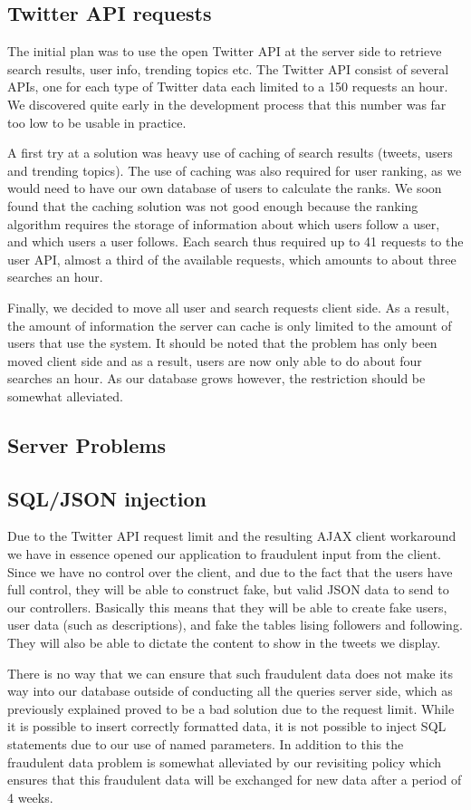 \subsection{Twitter API requests}
The initial plan was to use the open Twitter API at the server side to retrieve search results, user info, trending topics etc. The Twitter API consist of several APIs, one for each type of Twitter data each limited to a 150 requests an hour. We discovered quite early in the development process that this number was far too low to be usable in practice. 

A first try at a solution was heavy use of caching of search results (tweets, users and trending topics). The use of caching was also required for user ranking, as we would need to have our own database of users to calculate the ranks. We soon found that the caching solution was not good enough because the ranking algorithm requires the storage of information about which users follow a user, and which users a user follows. Each search thus required up to 41 requests to the user API, almost a third of the available requests, which amounts to about three searches an hour.

Finally, we decided to move all user and search requests client side. As a result, the amount of information the server can cache is only limited to the amount of users that use the system. It should be noted that the problem has only been moved client side and as a result, users are now only able to do about four searches an hour. As our database grows however, the restriction should be somewhat alleviated.

\subsection{Server Problems}

\subsection{SQL/JSON injection}
Due to the Twitter API request limit and the resulting AJAX client workaround we have in essence opened our application to fraudulent input from the client. Since we have no control over the client, and due to the fact that the users have full control, they will be able to construct fake, but valid JSON data to send to our controllers. Basically this means that they will be able to create fake users, user data (such as descriptions), and fake the tables lising followers and following. They will also be able to dictate the content to show in the tweets we display.

There is no way that we can ensure that such fraudulent data does not make its way into our database outside of conducting all the queries server side, which as previously explained proved to be a bad solution due to the request limit. While it is possible to insert correctly formatted data, it is not possible to inject SQL statements due to our use of named parameters. In addition to this the fraudulent data problem is somewhat alleviated by our revisiting policy which ensures that this fraudulent data will be exchanged for new data after a period of 4 weeks.
